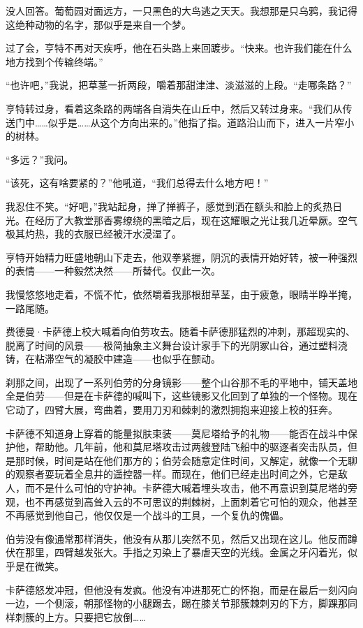 \documentclass[AutoFakeBold=true]{book}
\begin{document}
没人回答。葡萄园对面远方，一只黑色的大鸟逃之天天。我想那是只乌鸦，我记得这绝种动物的名字，那似乎是来自一个梦。

过了会，亨特不再对天疾呼，他在石头路上来回踱步。``快来。也许我们能在什么地方找到个传输终端。''

``也许吧，''我说，把草茎一折两段，嚼着那甜津津、淡滋滋的上段。``走哪条路？''

亨特转过身，看着这条路的两端各自消失在山丘中，然后又转过身来。``我们从传送门中……似乎是……从这个方向出来的。''他指了指。道路沿山而下，进入一片窄小的树林。

``多远？''我问。

``该死，这有啥要紧的？''他吼道，``我们总得去什么地方吧！''

我忍住不笑。``好吧，''我站起身，掸了掸裤子，感觉到洒在额头和脸上的炙热日光。在经历了大教堂那香雾缭绕的黑暗之后，现在这耀眼之光让我几近晕厥。空气极其灼热，我的衣服已经被汗水浸湿了。

亨特开始精力旺盛地朝山下走去，他双拳紧握，阴沉的表情开始好转，被一种强烈的表情——一种毅然决然——所替代。仅此一次。

我慢悠悠地走着，不慌不忙，依然嚼着我那根甜草茎，由于疲惫，眼睛半睁半掩，一路尾随。

\vspace*{1em}

费德曼·卡萨德上校大喊着向伯劳攻去。随着卡萨德那猛烈的冲刺，那超现实的、脱离了时间的风景——极简抽象主义舞台设计家手下的光阴冢山谷，通过塑料浇铸，在粘滞空气的凝胶中建造——也似乎在颤动。

刹那之间，出现了一系列伯劳的分身镜影——整个山谷那不毛的平地中，铺天盖地全是伯劳——但是在卡萨德的喊叫下，这些镜影又化回到了单独的一个怪物。现在它动了，四臂大展，弯曲着，要用刀刃和棘刺的激烈拥抱来迎接上校的狂奔。

卡萨德不知道身上穿着的能量拟肤束装——莫尼塔给予的礼物——能否在战斗中保护他，帮助他。几年前，他和莫尼塔攻击过两艘登陆飞船中的驱逐者突击队员，但是那时候，时间是站在他们那方的；伯劳会随意定住时间，又解定，就像一个无聊的观察者耍玩着全息井的遥控器一样。而现在，他们已经走出时间之外，它是敌人，而不是什么可怕的守护神。卡萨德大喊着埋头攻击，他不再意识到莫尼塔的旁观，也不再感觉到高耸入云的不可思议的荆棘树，上面刺着它可怕的观众，他甚至不再感觉到他自己，他仅仅是一个战斗的工具，一个复仇的傀儡。

伯劳没有像通常那样消失，他没有从那儿突然不见，然后又出现在这儿。他反而蹲伏在那里，四臂越发张大。手指之刃染上了暴虐天空的光线。金属之牙闪着光，似乎是在微笑。

卡萨德怒发冲冠，但他没有发疯。他没有冲进那死亡的怀抱，而是在最后一刻闪向一边，一个侧滚，朝那怪物的小腿踢去，踢在膝关节那簇棘刺刃的下方，脚踝那同样刺簇的上方。{\kaishu 只要把它放倒……}
\end{document}
